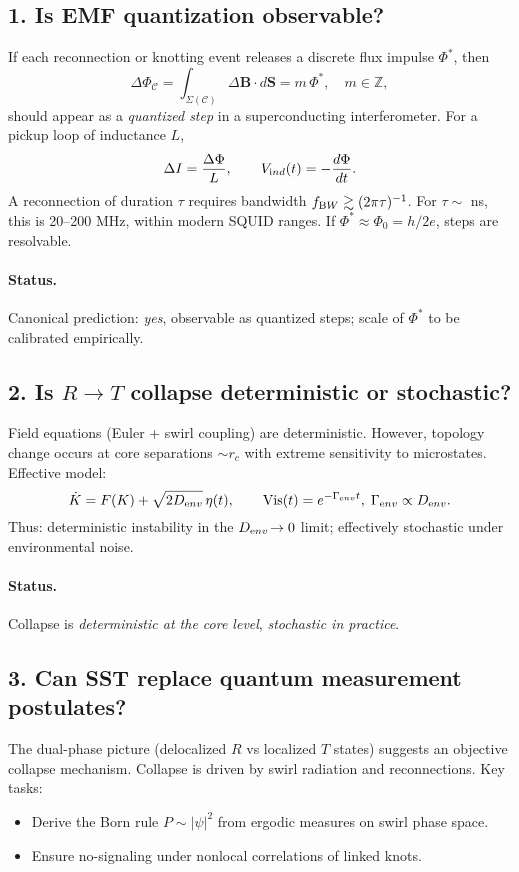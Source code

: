 \documentclass[11pt]{article}
\begin{document}
\subsection*{1. Is EMF quantization observable?}
    If each reconnection or knotting event releases a discrete flux impulse $\Phi^*$, then
    \[
        \Delta \Phi_{\mathcal{C}} = \int_{\Sigma(\mathcal{C})} \Delta \mathbf{B} \cdot d\mathbf{S} = m\,\Phi^*,\quad m\in\mathbb Z,
    \]
    should appear as a \emph{quantized step} in a superconducting interferometer.
    For a pickup loop of inductance $L$,
    \[
        \Delta I=\frac{\Delta\Phi}{L},\qquad V_{\textrm ind}(t)=-\frac{d\Phi}{dt}.
    \]
    A reconnection of duration $\tau$ requires bandwidth $f_{\textrm BW}\gtrsim (2\pi\tau)^{-1}$. For $\tau\sim$ ns, this is 20--200 MHz, within modern SQUID ranges. If $\Phi^*\approx\Phi_0=h/2e$, steps are resolvable.

    \paragraph{Status.} Canonical prediction: \emph{yes}, observable as quantized steps; scale of $\Phi^*$ to be calibrated empirically.

\subsection*{2. Is $R\!\to\!T$ collapse deterministic or stochastic?}
Field equations (Euler + swirl coupling) are deterministic. However, topology change occurs at core separations $\sim r_c$ with extreme sensitivity to microstates. Effective model:
\[
    \dot K=F(K)+\sqrt{2D_{\textrm env}}\,\eta(t),\qquad \text{Vis}(t)=e^{-\Gamma_{\textrm env} t},\;\Gamma_{\textrm env}\propto D_{\textrm env}.
\]
Thus: deterministic instability in the $D_{\textrm env}\!\to 0$ limit; effectively stochastic under environmental noise.

\paragraph{Status.} Collapse is \emph{deterministic at the core level}, \emph{stochastic in practice}.

\subsection*{3. Can SST replace quantum measurement postulates?}
The dual-phase picture (delocalized $R$ vs localized $T$ states) suggests an objective collapse mechanism. Collapse is driven by swirl radiation and reconnections.
Key tasks:
\begin{itemize}
\item Derive the Born rule $P\sim|\psi|^2$ from ergodic measures on swirl phase space.
\item Ensure no-signaling under nonlocal correlations of linked knots.
\end{itemize}
\end{document}
